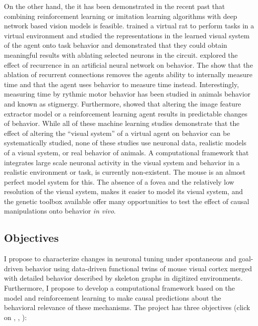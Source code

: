 \documentclass[B2,COG]{ercgrant}
\begin{document}
On the other hand, the it has been demonstrated in the recent past that combining reinforcement learning or imitation learning algorithms with deep network based vision models is feasible. 
\textcite{Merel2020-hf} trained a virtual rat to perform tasks in a virtual environment and studied the representations in the learned visual system of the agent onto task behavior and demonstrated that they could obtain meaningful results with ablating selected neurons in the circuit. 
\textcite{Deverett2019-gs} explored the effect of recurrence in an artificial neural network on behavior. 
The show that the ablation of recurrent connections removes the agents ability to internally measure time and that the agent uses behavior to measure time instead. 
Interestingly, measuring time by rythmic motor behavior has been studied in animals behavior and known as stigmergy.
Furthermore, \textcite{Hilton2020-jz} showed that altering the image feature extractor model or a reinforcement learning agent results in predictable changes of behavior.
While all of these machine learning studies demonstrate that the effect of altering the ``visual system'' of a virtual agent on behavior can be systematically studied, none of these studies use neuronal data, realistic models of a visual system, or real behavior of animals. 
A computational framework that integrates large scale neuronal activity in the visual system and behavior in a realistic environment or task, is currently non-existent. 
The mouse is an almost perfect model system for this. 
The absence of a fovea and the relatively low resolution of the visual system, makes it easier to model its visual system, and the genetic toolbox available offer many opportunities to test the effect of causal manipulations onto behavior \textit{in vivo}.

\subsection{Objectives}
I propose to characterize changes in neuronal tuning under spontaneous and goal-driven behavior using data-driven functional twins of mouse visual cortex merged with detailed behavior described by skeleton graphs in digitized environments.
Furthermore, I propose to develop a computational framework based on the model and reinforcement learning to make causal predictions about the behavioral relevance of these mechanisms. The project has three objectives (click on , , ):
\end{document}

